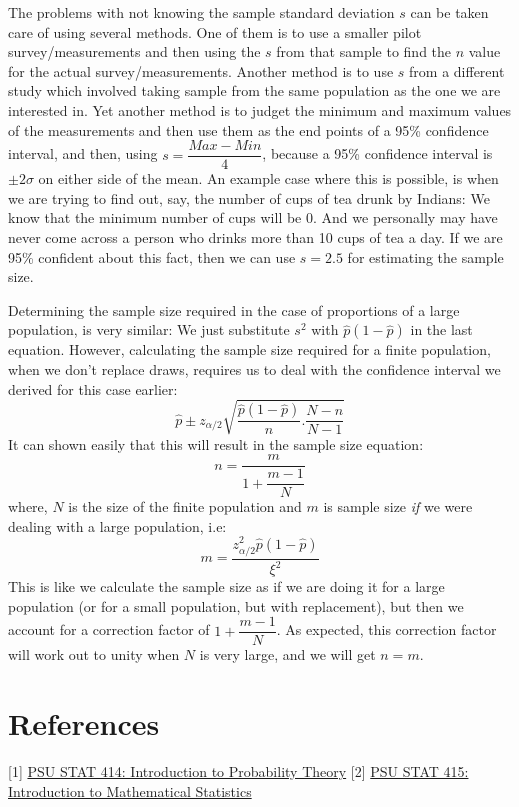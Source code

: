 The problems with not knowing the sample standard deviation $s$ can be taken care of using several methods. One of them is to use a smaller pilot survey/measurements and then using the $s$ from that sample to find the $n$ value for the actual survey/measurements. Another method is to use $s$ from a different study which involved taking sample from the same population as the one we are interested in. Yet another method is to judget the minimum and maximum values of the measurements and then use them as the end points of a 95\% confidence interval, and then, using \( s = \dfrac{Max-Min}{4} \), because a 95\% confidence interval is $\pm 2\sigma$ on either side of the mean. An example case where this is possible, is when we are trying to find out, say, the number of cups of tea drunk by Indians: We know that the minimum number of cups will be 0. And we personally may have never come across a person who drinks more than 10 cups of tea a day. If we are 95\% confident about this fact, then we can use $s = 2.5$ for estimating the sample size.

Determining the sample size required in the case of proportions of a large population, is very similar: We just substitute $s^2$ with \( \hat{p}(1-\hat{p}) \) in the last equation. However, calculating the sample size required for a finite population, when we don't replace draws, requires us to deal with the confidence interval we derived for this case earlier:
	\[ \hat{p}\pm z_{\alpha/2}\sqrt{\dfrac{\hat{p}(1-\hat{p})}{n} . \dfrac{N-n}{N-1}} \]
It can shown easily that this will result in the sample size equation:
	\[ n=\dfrac{m}{1+\dfrac{m-1}{N}} \]
where, $N$ is the size of the finite population and $m$ is sample size \emph{if} we were dealing with a large population, i.e:
	\[ m=\dfrac{z^2_{\alpha/2}\hat{p}(1-\hat{p})}{\xi^2}\]
This is like we calculate the sample size as if we are doing it for a large population (or for a small population, but with replacement), but then we account for a correction factor of \( 1+\dfrac{m-1}{N} \). As expected, this correction factor will work out to unity when $N$ is very large, and we will get $n=m$.

\section{References}
[1] \href{https://online.stat.psu.edu/stat414/}{PSU STAT 414: Introduction to Probability Theory}
[2] \href{https://online.stat.psu.edu/stat415/}{PSU STAT 415: Introduction to Mathematical Statistics}


